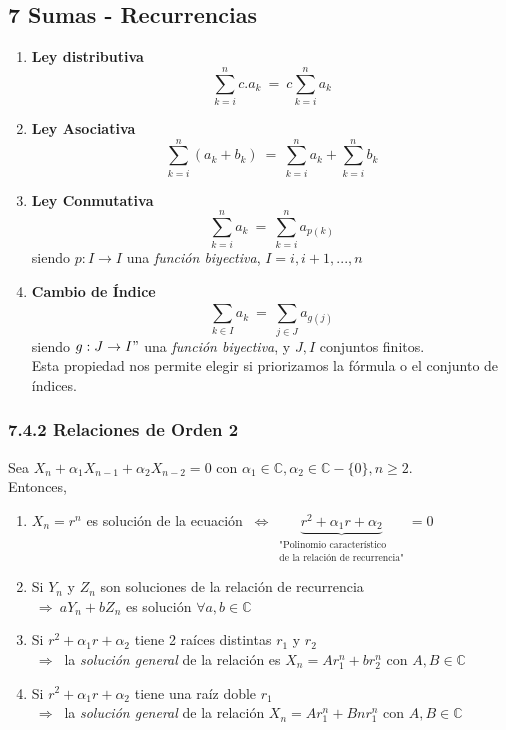 \documentclass{article}
\newcommand{\eq}{\:=\:}                                 %
\newcommand{\complejos}{\mathbb{C}}                     %
\newcommand{\Rightarrows}{\: \Rightarrow \:}            %
\newcommand{\Leftrightarrows}{\: \Leftrightarrow \:}    %
\newcommand{\sumatoria}[2]{\sum_{#1} ^{#2}}             %
\begin{document}
\subsection*{7 Sumas - Recurrencias}
\begin{enumerate}
    \item \textbf{Ley distributiva}
    \begin{equation*}
        \sumatoria{k=i}{n} c.a_k \eq c \sumatoria{k=i}{n} a_k
    \end{equation*}
    \item \textbf{Ley Asociativa}
    \begin{equation*}
        \sumatoria{k=i}{n} (a_k + b_k) \eq \sumatoria{k=i}{n} a_k + \sumatoria{k=i}{n} b_k
    \end{equation*}
    \item \textbf{Ley Conmutativa}
    \begin{equation*}
        \sumatoria{k=i}{n} a_k \eq \sumatoria{k=i}{n} a_{p(k)}
    \end{equation*}
    siendo $p: I \rightarrow I$ una \emph{función biyectiva}, $I = {i,i+1,...,n}$
    \item \textbf{Cambio de Índice}
    \begin{equation*}
        \sumatoria{k\in I}{} a_k \eq \sumatoria{j \in J}{} a_{g(j)}
    \end{equation*}
    siendo $g: J \rightarrow I"$ una \emph{función biyectiva}, y $J, I$ conjuntos finitos. 
    \\Esta propiedad nos permite elegir si priorizamos la fórmula o el conjunto de índices.
\end{enumerate}
\subsubsection*{7.4.2 Relaciones de Orden 2}
Sea $X_n+\alpha_1X_{n-1}+\alpha_2X_{n-2} = 0  \text{ con }\alpha_1 \in \complejos, \alpha_2 \in \complejos-\{0\}, n \geq 2$. 
\\Entonces,
\begin{enumerate}
    \item $X_n = r^n$ es solución de la ecuación $\Leftrightarrows  \underbrace{r^2+\alpha_1 r + \alpha_2}_{\substack{\text{"Polinomio característico} \\ \text{de la relación de recurrencia"}}} = 0$
    \item Si $Y_n$ y $Z_n$ son soluciones de la relación de recurrencia \\$\Rightarrows aY_n + bZ_n$ es solución $\forall a,b \in \complejos$
    \item Si $r^2+\alpha_1 r + \alpha_2$ tiene 2 raíces distintas $r_1$ y $r_2$
            \\$\Rightarrows$ la \emph{solución general} de la relación es $X_n = Ar_1^n + br_2^n$ con $A, B \in \complejos$
    \item Si $r^2 + \alpha_1 r + \alpha_2$ tiene una raíz doble $r_1$
            \\$\Rightarrows$ la \emph{solución general} de la relación $X_n=Ar_1^n+Bnr_1^n$ con $A,B \in \complejos$
\end{enumerate}
\end{document}
